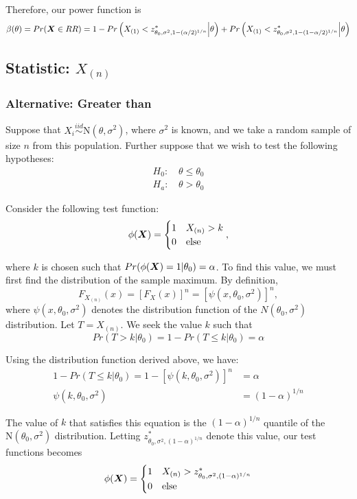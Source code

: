 \documentclass[]{article}
\newcommand{\bfX}{\mbox{\boldmath $X$}}
\begin{document}
Therefore, our power function is
\[
\beta(\theta) = Pr(\bfX \in RR) = 1 - Pr\left(X_{(1)} < z^*_{\theta_0, \sigma^2, 1 - (\alpha/2)^{1/n}} \Big| \theta\right) + Pr\left(X_{(1)} < z^*_{\theta_0, \sigma^2, 1 - (1-\alpha/2)^{1/n}} \Big| \theta\right)
\]

\subsection{Statistic: $X_{(n)}$}

\subsubsection{Alternative: Greater than}

Suppose that $X_i \stackrel{iid}{\sim} \text{N}(\theta, \sigma^2)$, where $\sigma^2$ is known, and we take a random sample of size $n$ from this population. Further suppose that we wish to test the following hypotheses:
\[
\begin{split}
\text{$H_0$: }& \theta \leq \theta_0 \\
\text{$H_a$: }& \theta > \theta_0
\end{split}
\]

Consider the following test function:
\[
\phi(\bfX) = \begin{cases}
1 & X_{(n)} > k \\
0 & \text{else}
\end{cases},
\]

where $k$ is chosen such that $Pr(\phi(\bfX) = 1|\theta_0) = \alpha$. To find this value, we must first find the distribution of the sample maximum. By definition,
\[
F_{X_{(n)}}(x) = [F_X(x)]^n = [\psi(x, \theta_0, \sigma^2)]^n,
\]
where $\psi(x, \theta_0, \sigma^2)$ denotes the distribution function of the $N(\theta_0, \sigma^2)$ distribution. Let $T = X_{(n)}$. We seek the value $k$ such that 
\[
Pr(T > k | \theta_0) = 1 - Pr(T \leq k | \theta_0) = \alpha
\]

Using the distribution function derived above, we have:
\[
\begin{split}
1 - Pr(T \leq k | \theta_0) = 1 - [\psi(k, \theta_0, \sigma^2)]^n &= \alpha \\
\psi(k, \theta_0, \sigma^2) &= (1 - \alpha)^{1/n}
\end{split}
\]

The value of $k$ that satisfies this equation is the $(1 - \alpha)^{1/n}$ quantile of the $\text{N}(\theta_0, \sigma^2)$ distribution. Letting $z^*_{\theta_0, \sigma^2, (1 - \alpha)^{1/n}}$ denote this value, our test functions becomes
\[
\phi(\bfX) = \begin{cases}
1 & X_{(n)} > z^*_{\theta_0, \sigma^2, (1 - \alpha)^{1/n}} \\
0 & \text{else}
\end{cases}
\]
\end{document}

